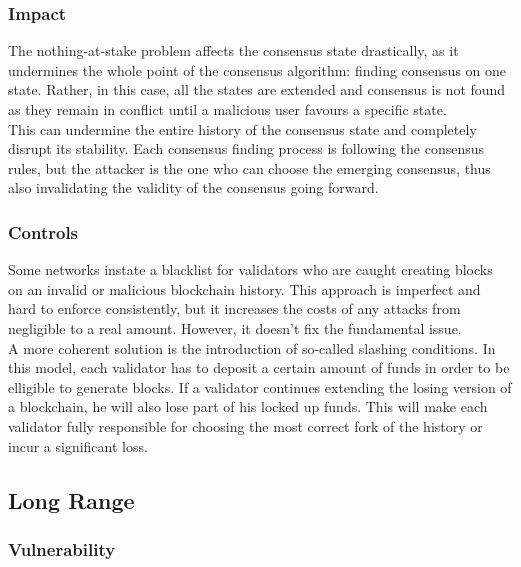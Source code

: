 \documentclass[11pt,a4paper,draft]{article}
\begin{document}
\subsubsection{Impact}

The nothing-at-stake problem affects the consensus state drastically, as it undermines the whole point of the consensus algorithm: finding consensus on one state. Rather, in this case, all the states are extended and consensus is not found as they remain in conflict until a malicious user favours a specific state.\\

This can undermine the entire history of the consensus state and completely disrupt its stability. Each consensus finding process is following the consensus rules, but the attacker is the one who can choose the emerging consensus, thus also invalidating the validity of the consensus going forward.\\

\subsubsection{Controls}

Some networks instate a blacklist for validators who are caught creating blocks on an invalid or malicious blockchain history. This approach is imperfect and hard to enforce consistently, but it increases the costs of any attacks from negligible to a real amount. However, it doesn't fix the fundamental issue.\\

A more coherent solution is the introduction of so-called slashing conditions. In this model, each validator has to deposit a certain amount of funds in order to be elligible to generate blocks. If a validator continues extending the losing version of a blockchain, he will also lose part of his locked up funds. This will make each validator fully responsible for choosing the most correct fork of the history or incur a significant loss.\\

\subsection{Long Range}

\subsubsection{Vulnerability}
\end{document}
